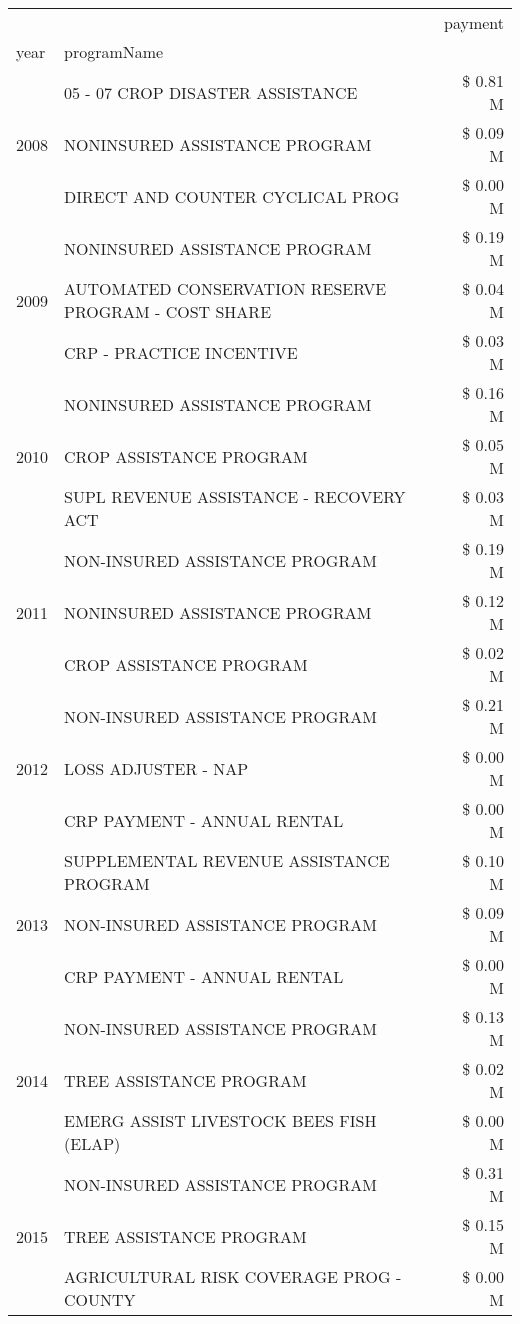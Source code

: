\begin{tabular}{llr}
\toprule
 &  & payment \\
year & programName &  \\
\midrule
\multirow[t]{3}{*}{2008} & 05 - 07 CROP DISASTER ASSISTANCE & \$ 0.81 M \\
 & NONINSURED ASSISTANCE PROGRAM & \$ 0.09 M \\
 & DIRECT AND COUNTER CYCLICAL PROG & \$ 0.00 M \\
\cline{1-3}
\multirow[t]{3}{*}{2009} & NONINSURED ASSISTANCE PROGRAM & \$ 0.19 M \\
 & AUTOMATED CONSERVATION RESERVE PROGRAM - COST SHARE & \$ 0.04 M \\
 & CRP - PRACTICE INCENTIVE & \$ 0.03 M \\
\cline{1-3}
\multirow[t]{3}{*}{2010} & NONINSURED ASSISTANCE PROGRAM & \$ 0.16 M \\
 & CROP ASSISTANCE PROGRAM & \$ 0.05 M \\
 & SUPL REVENUE ASSISTANCE - RECOVERY ACT & \$ 0.03 M \\
\cline{1-3}
\multirow[t]{3}{*}{2011} & NON-INSURED ASSISTANCE PROGRAM & \$ 0.19 M \\
 & NONINSURED ASSISTANCE PROGRAM & \$ 0.12 M \\
 & CROP ASSISTANCE PROGRAM & \$ 0.02 M \\
\cline{1-3}
\multirow[t]{3}{*}{2012} & NON-INSURED ASSISTANCE PROGRAM & \$ 0.21 M \\
 & LOSS ADJUSTER - NAP & \$ 0.00 M \\
 & CRP PAYMENT - ANNUAL RENTAL & \$ 0.00 M \\
\cline{1-3}
\multirow[t]{3}{*}{2013} & SUPPLEMENTAL REVENUE ASSISTANCE PROGRAM & \$ 0.10 M \\
 & NON-INSURED ASSISTANCE PROGRAM & \$ 0.09 M \\
 & CRP PAYMENT - ANNUAL RENTAL & \$ 0.00 M \\
\cline{1-3}
\multirow[t]{3}{*}{2014} & NON-INSURED ASSISTANCE PROGRAM & \$ 0.13 M \\
 & TREE ASSISTANCE PROGRAM & \$ 0.02 M \\
 & EMERG ASSIST LIVESTOCK BEES FISH (ELAP) & \$ 0.00 M \\
\cline{1-3}
\multirow[t]{3}{*}{2015} & NON-INSURED ASSISTANCE PROGRAM & \$ 0.31 M \\
 & TREE ASSISTANCE PROGRAM & \$ 0.15 M \\
 & AGRICULTURAL RISK COVERAGE PROG - COUNTY & \$ 0.00 M \\

\end{tabular}
